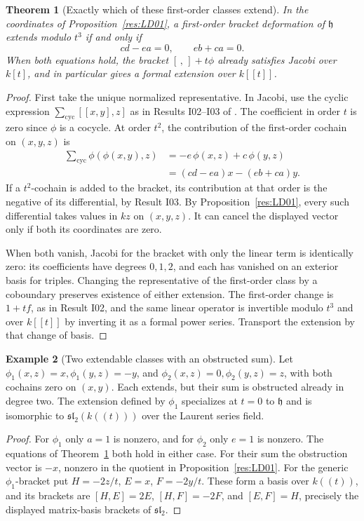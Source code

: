 \documentclass[11pt,oneside,openany]{book}
\newtheorem{theorem}{Theorem}[chapter]
\theoremstyle{definition}
\newtheorem{example}[theorem]{Example}
\theoremstyle{remark}
\begin{document}
\begin{theorem}[Exactly which of these first-order classes extend]
\label{res:LD02}
In the coordinates of Proposition~\ref{res:LD01}, a first-order
bracket deformation of \(\mathfrak h\) extends modulo \(t^3\)
if and only if
\[
                  cd-ea=0,\qquad eb+ca=0 .
\]
When both equations hold, the bracket \([\, ,\,]+t\phi\)
already satisfies Jacobi over \(k[t]\), and in particular gives
a formal extension over \(k[[t]]\).
\end{theorem}
\begin{proof}
First take the unique normalized representative. In Jacobi,
use the cyclic expression \(\sum_{\mathrm{cyc}}[[x,y],z]\)
as in Results I02--I03 of \cite{mg-lie}.
The coefficient in order \(t\) is zero since \(\phi\) is
a cocycle. At order \(t^2\), the contribution of the first-order
cochain on \((x,y,z)\) is
\[
 \begin{aligned}
   \sum_{\mathrm{cyc}}\phi(\phi(x,y),z)
    &= -e\,\phi(x,z)+c\,\phi(y,z)\\
    &= (cd-ea)x-(eb+ca)y .
 \end{aligned}
\]
If a \(t^2\)-cochain is added to the bracket, its contribution
at that order is the negative of its differential, by
Result I03. By Proposition~\ref{res:LD01}, every such differential
takes values in \(kz\) on \((x,y,z)\). It can cancel the
displayed vector only if both its coordinates are zero.

When both vanish, Jacobi for the bracket with only the linear
term is identically zero: its coefficients have degrees \(0,1,2\),
and each has vanished on an exterior basis for triples.
Changing the representative of the first-order class by a
coboundary preserves existence of either extension. The first-order
change is \(1+t f\), as in Result I02, and the same linear
operator is invertible modulo \(t^3\) and over \(k[[t]]\) by
inverting it as a formal power series. Transport the extension
by that change of basis.
\end{proof}

\begin{example}[Two extendable classes with an obstructed sum]
\label{res:LD03}
Let \(\phi_1(x,z)=x,\phi_1(y,z)=-y\), and
\(\phi_2(x,z)=0,\phi_2(y,z)=z\), with both cochains zero
on \((x,y)\). Each extends, but their sum is obstructed
already in degree two.
The extension defined by \(\phi_1\) specializes at \(t=0\)
to \(\mathfrak h\) and is isomorphic to
\(\mathfrak{sl}_2(k((t)))\) over the Laurent series field.
\end{example}
\begin{proof}
For \(\phi_1\) only \(a=1\) is nonzero, and for \(\phi_2\)
only \(e=1\) is nonzero. The equations of
Theorem~\ref{res:LD02} both hold in either case.
For their sum the obstruction vector is \(-x\), nonzero
in the quotient in Proposition~\ref{res:LD01}.
For the generic \(\phi_1\)-bracket put
\(H=-2z/t\), \(E=x\), \(F=-2y/t\). These form a basis over
\(k((t))\), and its brackets are \([H,E]=2E\),
\([H,F]=-2F\), and \([E,F]=H\), precisely the displayed
matrix-basis brackets of \(\mathfrak{sl}_2\).
\end{proof}
\end{document}
